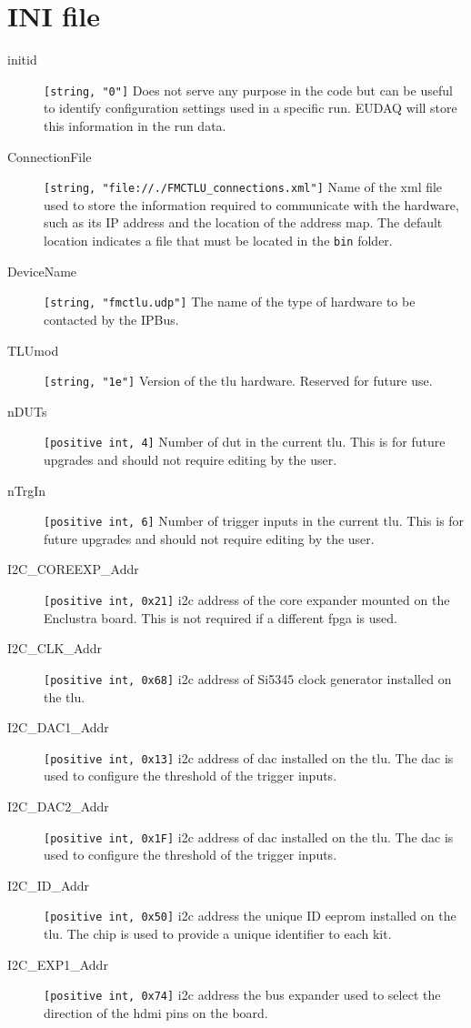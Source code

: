 \section{INI file}
\begin{description}
  \item[initid] \verb|[string, "0"]| Does not serve any purpose in the code but can be useful to identify configuration settings used in a specific run. EUDAQ will store this information in the run data.
  \item[ConnectionFile] \verb|[string, "file://./FMCTLU_connections.xml"]| Name of the xml file used to store the information required to communicate with the hardware, such as its IP address and the location of the address map. The default location indicates a file that must be located in the \texttt{bin} folder.
  \item[DeviceName] \verb|[string, "fmctlu.udp"]| The name of the type of hardware to be contacted by the IPBus.
  \item[TLUmod] \verb|[string, "1e"]| Version of the \gls{tlu} hardware. Reserved for future use.
  \item[nDUTs] \verb|[positive int, 4]| Number of \gls{dut} in the current \gls{tlu}. This is for future upgrades and should not require editing by the user.
  \item[nTrgIn] \verb|[positive int, 6]| Number of trigger inputs in the current \gls{tlu}. This is for future upgrades and should not require editing by the user.
  \item[I2C\_COREEXP\_Addr] \verb|[positive int, 0x21]| \gls{i2c} address of the core expander mounted on the Enclustra board. This is not required if a different \gls{fpga} is used.
  \item[I2C\_CLK\_Addr] \verb|[positive int, 0x68]| \gls{i2c} address of Si5345 clock generator installed on the \gls{tlu}.
  \item[I2C\_DAC1\_Addr] \verb|[positive int, 0x13]| \gls{i2c} address of \gls{dac} installed on the \gls{tlu}. The \gls{dac} is used to configure the threshold of the trigger inputs.
  \item[I2C\_DAC2\_Addr] \verb|[positive int, 0x1F]| \gls{i2c} address of \gls{dac} installed on the \gls{tlu}. The \gls{dac} is used to configure the threshold of the trigger inputs.
  \item[I2C\_ID\_Addr] \verb|[positive int, 0x50]| \gls{i2c} address the unique ID \gls{eeprom} installed on the \gls{tlu}. The chip is used to provide a unique identifier to each kit.
  \item[I2C\_EXP1\_Addr] \verb|[positive int, 0x74]| \gls{i2c} address the bus expander used to select the direction of the \gls{hdmi} pins on the board.

\end{description}
